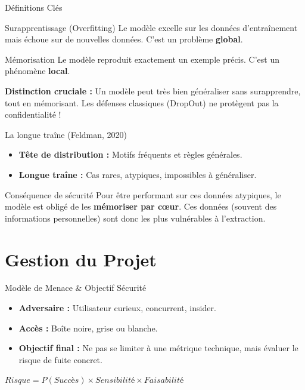 \documentclass[aspectratio=169, 10pt]{beamer}
\begin{document}
\begin{frame}{Définitions Clés}
    \begin{block}{Surapprentissage (Overfitting)}
    Le modèle excelle sur les données d'entraînement mais échoue sur de nouvelles données. C'est un problème \textbf{global}.
    \end{block}
    
    \begin{block}{Mémorisation}
    Le modèle reproduit exactement un exemple précis. C'est un phénomène \textbf{local}.
    \end{block}
    
    \vspace{0.5cm}
    \textbf{Distinction cruciale :} Un modèle peut très bien généraliser sans surapprendre, tout en mémorisant. Les défenses classiques (DropOut) ne protègent pas la confidentialité !
\end{frame}

\begin{frame}{La longue traîne (Feldman, 2020)}
    \begin{itemize}
        \item \textbf{Tête de distribution :} Motifs fréquents et règles générales.
        \item \textbf{Longue traîne :} Cas rares, atypiques, impossibles à généraliser.
    \end{itemize}
    \begin{alertblock}{Conséquence de sécurité}
    Pour être performant sur ces données atypiques, le modèle est obligé de les \textbf{mémoriser par cœur}. Ces données (souvent des informations personnelles) sont donc les plus vulnérables à l'extraction.
    \end{alertblock}
\end{frame}

\section{Gestion du Projet}

\begin{frame}{Modèle de Menace \& Objectif Sécurité}
    \begin{itemize}
        \item \textbf{Adversaire :} Utilisateur curieux, concurrent, insider.
        \item \textbf{Accès :} Boîte noire, grise ou blanche.
        \item \textbf{Objectif final :} Ne pas se limiter à une métrique technique, mais évaluer le risque de fuite concret.
    \end{itemize}
    
    \vspace{0.5cm}
    \begin{center}
    \LARGE $Risque = P(Succès) \times Sensibilité \times Faisabilité$
    \end{center}
\end{frame}
\end{document}
